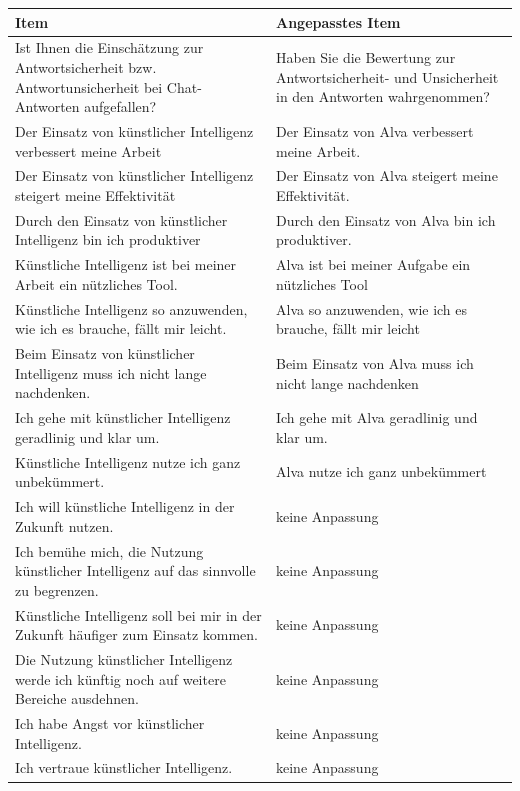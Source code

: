 \begin{center}
\begin{threeparttable}
\caption{Alle Fragebogen-Items}
\label{tab:master_items}
\begin{tabularx}{\textwidth}{X X}
\toprule
\textbf{Item} & \textbf{Angepasstes Item} \\
\midrule
Ist Ihnen die Einschätzung zur Antwortsicherheit bzw. Antwortunsicherheit bei Chat-Antworten aufgefallen? & Haben Sie die Bewertung zur Antwortsicherheit- und Unsicherheit in den Antworten wahrgenommen? \\
Der Einsatz von künstlicher Intelligenz verbessert meine Arbeit & Der Einsatz von Alva verbessert meine Arbeit. \\
Der Einsatz von künstlicher Intelligenz steigert meine Effektivität & Der Einsatz von Alva steigert meine Effektivität. \\
Durch den Einsatz von künstlicher Intelligenz bin ich produktiver & Durch den Einsatz von Alva bin ich produktiver. \\
Künstliche Intelligenz ist bei meiner Arbeit ein nützliches Tool. & Alva ist bei meiner Aufgabe ein nützliches Tool \\
Künstliche Intelligenz so anzuwenden, wie ich es brauche, fällt mir leicht. & Alva so anzuwenden, wie ich es brauche, fällt mir leicht \\
Beim Einsatz von künstlicher Intelligenz muss ich nicht lange nachdenken. & Beim Einsatz von Alva muss ich nicht lange nachdenken \\
Ich gehe mit künstlicher Intelligenz geradlinig und klar um. & Ich gehe mit Alva geradlinig und klar um. \\
Künstliche Intelligenz nutze ich ganz unbekümmert. & Alva nutze ich ganz unbekümmert \\
Ich will künstliche Intelligenz in der Zukunft nutzen. & keine Anpassung \\
Ich bemühe mich, die Nutzung künstlicher Intelligenz auf das sinnvolle zu begrenzen. & keine Anpassung \\
Künstliche Intelligenz soll bei mir in der Zukunft häufiger zum Einsatz kommen. & keine Anpassung \\
Die Nutzung künstlicher Intelligenz werde ich künftig noch auf weitere Bereiche ausdehnen. & keine Anpassung \\
Ich habe Angst vor künstlicher Intelligenz. & keine Anpassung \\
Ich vertraue künstlicher Intelligenz. & keine Anpassung \\

\end{tabularx}
\end{threeparttable}
\end{center}
